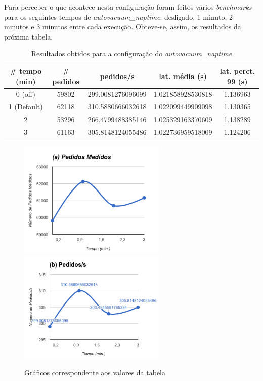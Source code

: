 Para perceber o que acontece nesta configuração foram feitos vários \textit{benchmarks} para os seguintes tempos de \textit{autovacuum\_naptime}: desligado, 1 minuto, 2 minutos e 3 minutos entre cada execução. Obteve-se, assim, os resultados da próxima tabela.

\begin{table}[!h]
\center
\small
\begin{tabular}{|c|c|c|c|c|}
\hline
\textbf{\# tempo (min)} & \textbf{\# pedidos} & \textbf{pedidos/s} & \textbf{lat. média (s)} & \textbf{lat. perct. 99 (s)}  \\ \hline
0 (off) & 59802 & 299.0081276096099 & 1.021858928530818 & 1.136963  \\ \hline
1 (Default) & 62118 & 310.5880666032618 & 1.022099449909098 & 1.130365  \\ \hline
2 & 53296 & 266.4799488385146 & 1.025329163370609 & 1.138289  \\ \hline
3 & 61163 & 305.8148124055486 & 1.022736959518009 & 1.124206  \\ \hline
\end{tabular}
\caption{Resultados obtidos para a configuração do \textit{autovacuum\_naptime}}
\end{table}

\begin{figure}[ht!]
\centering
\includegraphics[width=70mm]{img/05_vacuum_a.png}
\includegraphics[width=70mm]{img/05_vacuum_b.png}
\caption{Gráficos correspondente aos valores da tabela \label{overflow}}
\end{figure}

